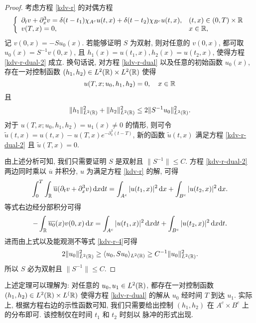\begin{proof}
考虑方程 \eqref{kdv-r} 的对偶方程
\begin{equation}
        \left\lbrace\begin{array}{ll}
        \partial_t v +\partial_x^3v=\delta(t-t_1)\chi_{A^c}u(t,x)+\delta(t-t_2)\chi_{B^c}u(t,x), & (t,x)\in (0,T)\times \mathbb{R} \\
        v(T,x)=0,& x\in \mathbb{R},
    \end{array}\right.\label{kdv-r-dual-2}
\end{equation}
记 $v(0,x)=-S u_0(x)$. 若能够证明 $S$ 为双射, 则对任意的 $v(0,x)$, 都可取 $u_0(x)=S^{-1}v(0,x)$, 且 $ h_1(x)=u(t_1,x),h_2(x)=u(t_2,x)$, 使得方程 \eqref{kdv-r-dual-2} 成立. 换句话说, 对方程 \eqref{kdv-r-dual} 以及任意的初始函数 $u_0(x)$, 存在一对控制函数 $(h_1,h_2)\in L^2(\mathbb{R})\times L^2(\mathbb{R})$ 使得
\begin{equation*}
    u(T,x;u_0,h_1,h_2)=0,\quad x\in\mathbb{R}
\end{equation*}
且
\begin{equation*}
     \|h_1\|^2_{L^2(\mathbb{R})}+\|h_2\|^2_{L^2(\mathbb{R})}\le 2 \|S^{-1}u_0\|^2_{L^2(\mathbb{R})}.
\end{equation*}
对于 $u(T,x;u_0,h_1,h_2)=u_1(x)\neq 0$ 的情形, 则可令 $\tilde{u}(t,x)=u(t,x)-u(T,x)e^{-\partial_x^3(t-T)}$, 新的函数 $\tilde{u}(t,x)$ 满足方程 \eqref{kdv-r-dual-2} 且 $\tilde{u}(T,x)=0$.

由上述分析可知, 我们只需要证明 $S$ 是双射且 $\|S^{-1}\|\le C$. 方程 \eqref{kdv-r-dual-2} 两边同时乘以 $\overline{u}$ 并积分, $u$ 为满足方程 \eqref{kdv-r} 的解, 可得
\begin{equation*}
    \int_0^T\int_{\mathbb{R}} \overline{u}(\partial_t v+\partial_x^3 v)\,\mathrm{d} x\mathrm{d}t=\int_{A^c}|u(t_1,x)|^2\,\mathrm{d} x+\int_{B^c}|u(t_2,x)|^2 \,\mathrm{d} x.
\end{equation*}
等式右边经分部积分可得
\begin{equation*}
    -\int_{\mathbb{R}} \overline{u_0}(x)v(0,x)\,\mathrm{d} x =\int_{A^c}|u(t_1,x)|^2\,\mathrm{d} x\mathrm{d}t+\int_{B^c}|u(t_2,x)|^2 \,\mathrm{d} x\mathrm{d}t.
\end{equation*}
进而由上式以及能观测不等式 \eqref{kdv-r-4}可得
\begin{equation*}
    2\|u_0\|^2_{L^2(\mathbb{R})}\ge\langle u_0,Su_0 \rangle_{L^2(\mathbb{R})}\ge C^{-1}\|u_0\|^2_{L^2(\mathbb{R})}.
\end{equation*}
所以 $S$ 必为双射且 $\|S^{-1}\|\le C$.
\end{proof}

\begin{remark}
上述定理可以理解为: 对任意的 $u_0,u_1\in L^2(\mathbb{R})$, 都存在一对控制函数 $(h_1,h_2)\in L^2(\mathbb{R})\times L^(\mathbb{R})$ 使得方程 \eqref{kdv-r-dual} 的解从 $u_0$ 经时间 $T$ 到达 $u_1$. 实际上, 根据方程右边的示性函数可知, 我们只需要给出控制 $(h_1,h_2)$ 在 $A^c\times B^c$ 上的分布即可. 该控制仅在时间 $t_1$ 和 $t_2$ 时刻以 脉冲的形式出现.
\end{remark}


